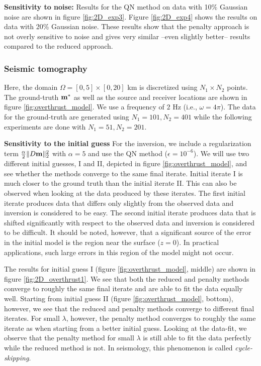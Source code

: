\documentclass{iopart}
\begin{document}
\textbf{Sensitivity to noise:}
Results for the QN method on data with 10\% Gaussian noise are shown in figure  \ref{fig:2D_exp3}. Figure \ref{fig:2D_exp4} shows the results on data with 20\% Gaussian noise. These results show that the penalty approach is not overly sensitive to noise and gives very similar --even slightly better-- results compared to the reduced approach. 

\subsubsection{Seismic tomography}
Here, the domain $\Omega = [0,5]\times [0,20]$ km is discretized using $N_1\times N_2$ points. The ground-truth $\mathbf{m}^*$ as well as the source and receiver locations are shown in figure \ref{fig:overthrust_model}. We use a frequency of $2$ Hz (i.e., $\omega = 4\pi$). The data for the ground-truth are generated using $N_1=101, N_2=401$ while the following experiments are done with $N_1=51, N_2=201$. 

\textbf{Sensitivity to the initial guess}
For the inversion, we include a regularization term $\frac{\alpha}{2} \|D\mathbf{m}\|_2^2$ with $\alpha = 5$ and use the QN method ($\epsilon=10^{-6}$). We will use two different initial guesses, I and II, depicted in figure \ref{fig:overthrust_model}, and see whether the methods converge to the same final iterate. Initial iterate I is much closer to the ground truth than the initial iterate II. This can also be observed when looking at the data produced by these iterates. The first initial iterate produces data that differs only slightly from the observed data and inversion is considered to be easy. The second initial iterate produces data that is shifted significantly with respect to the observed data and inversion is considered to be difficult. It should be noted, however, that a significant source of the error in the initial model is the region near the surface ($z=0$). In practical applications, such large errors in this region of the model might not occur.

The results for initial guess I (figure \ref{fig:overthrust_model}, middle) are shown in figure \ref{fig:2D_overthrust1}. We see that both the reduced and penalty methods converge to roughly the same final iterate and are able to fit the data equally well. Starting from initial guess II (figure \ref{fig:overthrust_model}, bottom), however, we see that the reduced and penalty methods converge to different final iterates. For small $\lambda$, however, the penalty method converges to roughly the same iterate as when starting from a better initial guess. Looking at the data-fit, we observe that the penalty method for small $\lambda$ is still able to fit the data perfectly while the reduced method is not. In seismology, this phenomenon is called \emph{cycle-skipping}.
\end{document}

